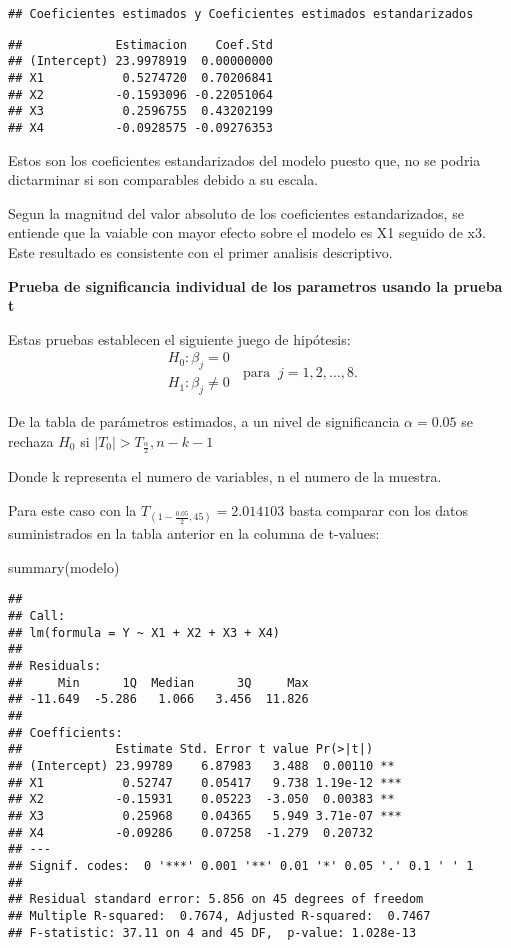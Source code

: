 \documentclass[
]{article}
\newenvironment{Shaded}{\begin{snugshade}}{\end{snugshade}}
\newcommand{\FunctionTok}[1]{\textcolor[rgb]{0.00,0.00,0.00}{#1}}
\newcommand{\NormalTok}[1]{#1}
\begin{document}
\begin{verbatim}
## Coeficientes estimados y Coeficientes estimados estandarizados
\end{verbatim}

\begin{verbatim}
##             Estimacion    Coef.Std
## (Intercept) 23.9978919  0.00000000
## X1           0.5274720  0.70206841
## X2          -0.1593096 -0.22051064
## X3           0.2596755  0.43202199
## X4          -0.0928575 -0.09276353
\end{verbatim}

Estos son los coeficientes estandarizados del modelo puesto que, no se
podria dictarminar si son comparables debido a su escala.

Segun la magnitud del valor absoluto de los coeficientes estandarizados,
se entiende que la vaiable con mayor efecto sobre el modelo es X1
seguido de x3. Este resultado es consistente con el primer analisis
descriptivo.

\textbf{Prueba de significancia individual de los parametros usando la
prueba t}

Estas pruebas establecen el siguiente juego de hipótesis:
\[\begin{array}{l} H_0: \beta_j = 0\\ H_1: \beta_j \ne 0 \end{array}\ \text{ para }\ j = 1, 2, \ldots, 8.\]

De la tabla de parámetros estimados, a un nivel de significancia
\(\alpha = 0.05\) se rechaza \(H_0\) si
\(\left | T_0 \right |> T_\frac{\alpha }{2} ,n-k-1\)

Donde k representa el numero de variables, n el numero de la muestra.

Para este caso con la \(T_{(1-\frac{0.05}{2},45)}=2.014103\) basta
comparar con los datos suministrados en la tabla anterior en la columna
de t-values:

\begin{Shaded}
\begin{Highlighting}[]
\FunctionTok{summary}\NormalTok{(modelo)}
\end{Highlighting}
\end{Shaded}

\begin{verbatim}
## 
## Call:
## lm(formula = Y ~ X1 + X2 + X3 + X4)
## 
## Residuals:
##     Min      1Q  Median      3Q     Max 
## -11.649  -5.286   1.066   3.456  11.826 
## 
## Coefficients:
##             Estimate Std. Error t value Pr(>|t|)    
## (Intercept) 23.99789    6.87983   3.488  0.00110 ** 
## X1           0.52747    0.05417   9.738 1.19e-12 ***
## X2          -0.15931    0.05223  -3.050  0.00383 ** 
## X3           0.25968    0.04365   5.949 3.71e-07 ***
## X4          -0.09286    0.07258  -1.279  0.20732    
## ---
## Signif. codes:  0 '***' 0.001 '**' 0.01 '*' 0.05 '.' 0.1 ' ' 1
## 
## Residual standard error: 5.856 on 45 degrees of freedom
## Multiple R-squared:  0.7674, Adjusted R-squared:  0.7467 
## F-statistic: 37.11 on 4 and 45 DF,  p-value: 1.028e-13
\end{verbatim}
\end{document}
